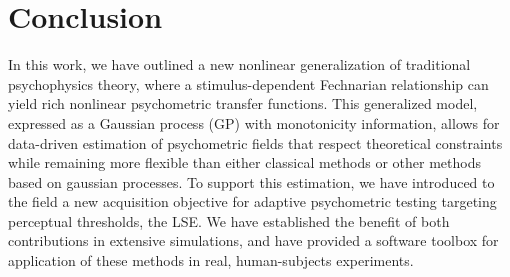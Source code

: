 \documentclass[../main.tex]{subfiles}
\begin{document}
\section{Conclusion}

In this work, we have outlined a new nonlinear generalization of traditional psychophysics theory, where a stimulus-dependent Fechnarian relationship can yield rich nonlinear psychometric transfer functions. This generalized model, expressed as a Gaussian process (GP) with monotonicity information, allows for data-driven estimation of psychometric fields that respect theoretical constraints while remaining more flexible than either classical methods or other methods based on gaussian processes. To support this estimation, we have introduced to the field a new acquisition objective for adaptive psychometric testing targeting perceptual thresholds, the LSE. We have established the benefit of both contributions in extensive simulations, and have provided a software toolbox for application of these methods in real, human-subjects experiments.
\end{document}
